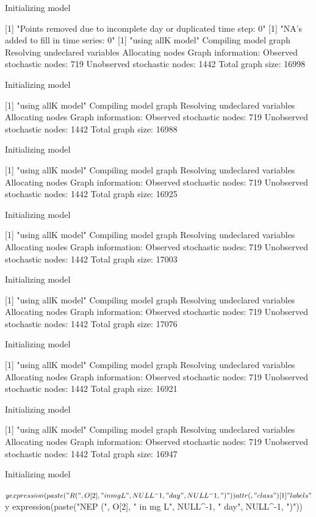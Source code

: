 \documentclass[11pt,lineno]{manuscript}\usepackage[]{graphicx}\usepackage[]{xcolor}
\begin{document}
Initializing model

[1] "Points removed due to incomplete day or duplicated time step: 0"
[1] "NA's added to fill in time series: 0"
[1] "using allK model"
Compiling model graph
   Resolving undeclared variables
   Allocating nodes
Graph information:
   Observed stochastic nodes: 719
   Unobserved stochastic nodes: 1442
   Total graph size: 16998

Initializing model

[1] "using allK model"
Compiling model graph
   Resolving undeclared variables
   Allocating nodes
Graph information:
   Observed stochastic nodes: 719
   Unobserved stochastic nodes: 1442
   Total graph size: 16988

Initializing model

[1] "using allK model"
Compiling model graph
   Resolving undeclared variables
   Allocating nodes
Graph information:
   Observed stochastic nodes: 719
   Unobserved stochastic nodes: 1442
   Total graph size: 16925

Initializing model

[1] "using allK model"
Compiling model graph
   Resolving undeclared variables
   Allocating nodes
Graph information:
   Observed stochastic nodes: 719
   Unobserved stochastic nodes: 1442
   Total graph size: 17003

Initializing model

[1] "using allK model"
Compiling model graph
   Resolving undeclared variables
   Allocating nodes
Graph information:
   Observed stochastic nodes: 719
   Unobserved stochastic nodes: 1442
   Total graph size: 17076

Initializing model

[1] "using allK model"
Compiling model graph
   Resolving undeclared variables
   Allocating nodes
Graph information:
   Observed stochastic nodes: 719
   Unobserved stochastic nodes: 1442
   Total graph size: 16921

Initializing model

[1] "using allK model"
Compiling model graph
   Resolving undeclared variables
   Allocating nodes
Graph information:
   Observed stochastic nodes: 719
   Unobserved stochastic nodes: 1442
   Total graph size: 16947

Initializing model

$y
expression(paste("R (", O[2], " in mg L", NULL^-1, " day", NULL^-1, 
    ")"))

attr(,"class")
[1] "labels"
$y
expression(paste("NEP (", O[2], " in mg L", NULL^-1, " day", 
    NULL^-1, ")"))
\end{document}
